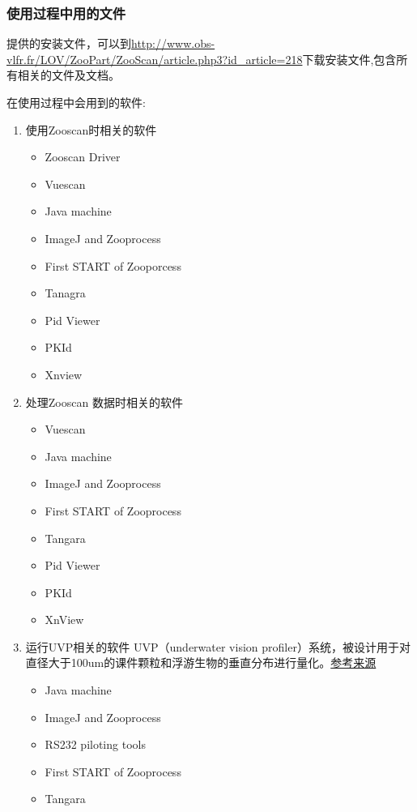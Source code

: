	\subsubsection{使用过程中用的文件}
		提供的安装文件，可以到\url{http://www.obs-vlfr.fr/LOV/ZooPart/ZooScan/article.php3?id_article=218}下载安装文件,包含所有相关的文件及文档。
		
		在使用过程中会用到的软件:
		
		\begin{enumerate}
			\item 使用Zooscan时相关的软件
				\begin{itemize}
					\item Zooscan Driver
					\item Vuescan
					\item Java machine
					\item ImageJ and Zooprocess
					\item	First START of Zooporcess
					\item Tanagra 
					\item Pid Viewer
					\item PKId
					\item Xnview
				\end{itemize}
			\item 处理Zooscan 数据时相关的软件
				\begin{itemize}
					\item Vuescan
					\item Java machine
					\item ImageJ and Zooprocess
					\item First START of Zooprocess
					\item	Tangara
					\item Pid Viewer
					\item PKId
					\item XnView
				\end{itemize}
			\item 运行UVP相关的软件
				UVP（underwater vision profiler）系统，被设计用于对直径大于100um的课件颗粒和浮游生物的垂直分布进行量化。\href{http://www.doc88.com/p-1921921926742.html}{参考来源}
				\begin{itemize}
					\item Java machine
					\item ImageJ and Zooprocess
					\item RS232 piloting tools
					\item First START of Zooprocess
					\item	Tangara

\end{itemize}
\end{enumerate}
